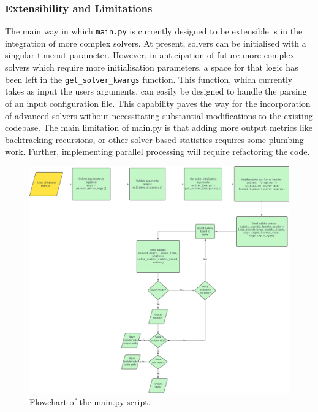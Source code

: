 \documentclass[11pt]{article}
\begin{document}
\subsubsection{Extensibility and Limitations}
The main way in which \texttt{main.py} is currently designed to be extensible is in the integration of more complex solvers. At present, solvers can be initialised with a singular timeout parameter. However, in anticipation of future more complex solvers which require more initialisation parameters, a space for that logic has been left in the \texttt{get\_solver\_kwargs} function. This function, which currently takes as input the users arguments, can easily be designed to handle the parsing of an input configuration file. This capability paves the way for the incorporation of advanced solvers without necessitating substantial modifications to the existing codebase. 
The main limitation of main.py is that adding more output metrics like backtracking recursions, or other solver based statistics requires some plumbing work. Further, implementing parallel processing will require refactoring the code. 
\begin{figure}[H]
    \centering
    \includegraphics[width=1\textwidth]{figs/main_flowchart.png}
    \caption{Flowchart of the main.py script.}
    \label{fig:main_flowchart}
\end{figure}
\end{document}
